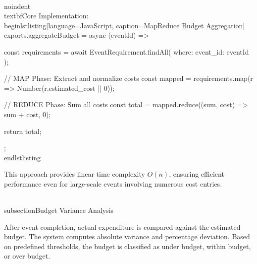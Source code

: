 \\noindent\\textbf{Core Implementation:}
\\begin{lstlisting}[language=JavaScript, caption=MapReduce Budget Aggregation]
exports.aggregateBudget = async (eventId) => {
  const requirements = await EventRequirement.findAll({
    where: { event_id: eventId }
  });

  // MAP Phase: Extract and normalize costs
  const mapped = requirements.map(r => Number(r.estimated_cost || 0));

  // REDUCE Phase: Sum all costs
  const total = mapped.reduce((sum, cost) => sum + cost, 0);

  return total;
};
\\end{lstlisting}

This approach provides linear time complexity $O(n)$, ensuring efficient performance even for large-scale events involving numerous cost entries.

\\subsection{Budget Variance Analysis}

After event completion, actual expenditure is compared against the estimated budget. The system computes absolute variance and percentage deviation. Based on predefined thresholds, the budget is classified as under budget, within budget, or over budget.

